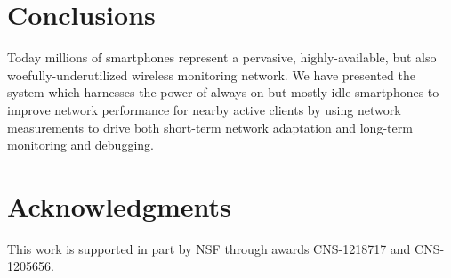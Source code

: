 \section{Conclusions}
\label{sec-conclusions}

Today millions of smartphones represent a pervasive, highly-available, but
also woefully-underutilized wireless monitoring network. We have presented
the \PS{} system which harnesses the power of always-on but mostly-idle
smartphones to improve network performance for nearby active clients by using
network measurements to drive both short-term network adaptation and
long-term monitoring and debugging.

\section*{Acknowledgments}

This work is supported in part by NSF through awards CNS-1218717 and
CNS-1205656.
